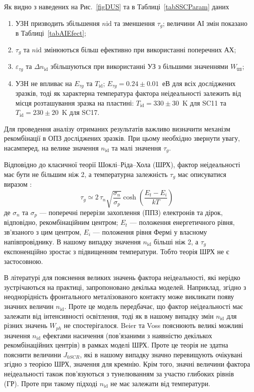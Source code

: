 Як видно з наведених на Рис.~\ref{figDUS} та в Таблиці~\ref{tabSSCParam} даних
\begin{enumerate}[label=\asbuk*),leftmargin=0em,itemindent=1.5em]
\item УЗН призводить збільшення $n\mathrm{id}$ та зменшення $\tau_{g}$;
   величини АІ змін показано в Таблиці~\ref{tabAIEfect};
\item $\tau_{g}$ та $n\mathrm{id}$ змінюються більш ефективно при використанні поперечних АХ;
\item $\varepsilon_{\tau g}$ та $\Delta n_\mathrm{id}$ збільшуються при використанні УЗ з більшими значеннями $W_{\mathtt{US}}$;
\item УЗН не впливає на $E_{\tau g}$ та $T_\mathrm{id}$;
 $E_{\tau g}=0.24\pm0.01$~еВ для всіх досліджених зразків,
 тоді як характерна температура фактора неідеальності залежить від місця розташування зразка на пластині: $T_\mathrm{id}=330\pm30$~K для SC11 та $T_\mathrm{id}=230\pm20$~K для SC17.
\end{enumerate}

Для проведення аналізу отриманих результатів важливо визначити механізм рекомбінації в ОПЗ досліджених зразків.
При цьому необхідно звернути увагу, насамперед, на велике значення  $n_{\mathrm{id}}$ та малі значення $\tau_g$.

Відповідно до класичної теорії Шоклі--Ріда--Хола (ШРХ),
фактор неідеальності має бути не більшим ніж 2, а температурна залежність $\tau_g$ має описуватися виразом \cite{TAUg:Schroder,TAUg:Aharoni}:
\begin{equation}
  \tau_g\simeq2\,\tau_n\sqrt{\frac{\sigma_n}{\sigma_p}}\cosh\left(\frac{E_t-E_i}{kT}\right)
\end{equation}
де
$\sigma_n$ та $\sigma_p$ --- поперечні перерізи захоплення (ППЗ) електронів та дірок, відповідно,
рекомбінаційним центром;
$E_t$ --- положення енергетичного рівня, зв'язаного з цим центром,
$E_i$  --- положення рівня Фермі у власному напівпровіднику.
В нашому випадку значення $n_{\mathrm{id}}$ більші ніж 2,
а $\tau_g$ експоненційно зростає з підвищенням температури.
Тобто теорія ШРХ не є застосовною.

В літературі для пояснення великих значень фактора неідеальності, які нерідко зустрічаються на практиці,
запропоновано декілька моделей.
Наприклад, згідно з \cite{Heide} неоднорідність фронтального металізованого контакту може викликати появу значних величин $n_\mathrm{id}$.
Проте це модель передбачає, що фактор неідеальності має залежати від інтенсивності освітлення, тоді як в нашому випадку змін $n_\mathrm{id}$ для різних
значень $W_{ph}$ не спостерігалося.
Beier та Voss \cite{Beier} пояснюють великі можливі значення $n_\mathrm{id}$ ефектами насичення (пов'язаними з наявністю декількох
рекомбінаційних центрів) в рамках моделі ШРХ.
Проте це теорія не здатна пояснити величини $J_{0SCR}$, які в нашому випадку значно перевищують очікувані згідно з теорією ШРХ, значення для кремнію.
Крім того, значні величини фактора неідеальності також пов'язуються з тунелюванням за участю глибоких рівнів (ГР)\cite{Shah,Kaminski_n}.
Проте при такому підході $n_\mathrm{id}$ не має залежати від температури.

